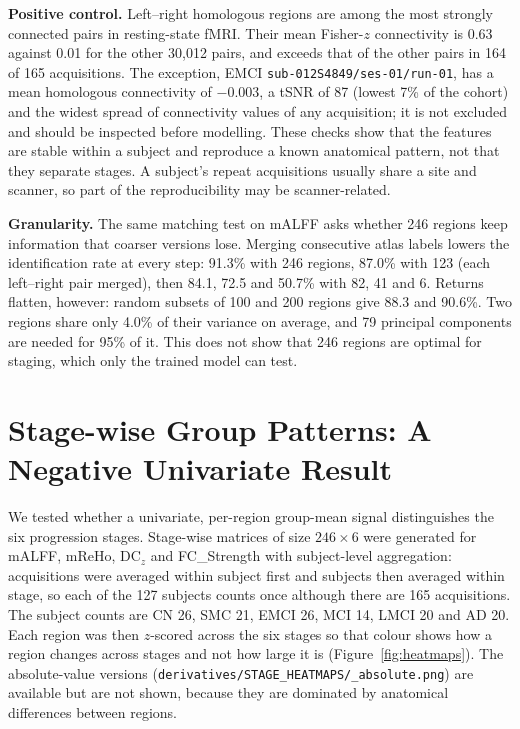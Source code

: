 \documentclass{ssnreview}
\begin{document}
\textbf{Positive control.} Left--right homologous regions are among the most strongly connected
pairs in resting-state fMRI. Their mean Fisher-$z$ connectivity is 0.63 against 0.01 for the other
30{,}012 pairs, and exceeds that of the other pairs in 164 of 165 acquisitions. The exception, EMCI
\texttt{sub-012S4849/\allowbreak ses-01/\allowbreak run-01}, has a mean homologous connectivity of $-0.003$, a
tSNR of 87 (lowest 7\% of the cohort) and the widest spread of connectivity values of any
acquisition; it is not excluded and should be inspected before modelling. These checks show that the
features are stable within a subject and reproduce a known anatomical pattern, not that they separate
stages. A subject's repeat acquisitions usually share a site and scanner, so part of the
reproducibility may be scanner-related.

\textbf{Granularity.} The same matching test on mALFF asks whether 246 regions keep information
that coarser versions lose. Merging consecutive atlas labels lowers the identification rate at every
step: 91.3\% with 246 regions, 87.0\% with 123 (each left--right pair merged), then 84.1, 72.5 and
50.7\% with 82, 41 and 6. Returns flatten, however: random subsets of 100 and 200 regions give 88.3
and 90.6\%. Two regions share only 4.0\% of their variance on average, and 79 principal components
are needed for 95\% of it. This does not show that 246 regions are optimal for staging, which only
the trained model can test.

\section{Stage-wise Group Patterns: A Negative Univariate Result}\label{sec:heatmaps}

We tested whether a univariate, per-region group-mean signal distinguishes the six
progression stages. Stage-wise matrices of size $246\times6$ were generated for
mALFF, mReHo, DC$_z$ and FC\_Strength with subject-level aggregation: acquisitions
were averaged within subject first and subjects then averaged within stage, so each
of the 127 subjects counts once although there are 165 acquisitions. The subject
counts are CN 26, SMC 21, EMCI 26, MCI 14, LMCI 20 and AD 20. Each region was then
$z$-scored across the six stages so that colour shows how a region changes across
stages and not how large it is (Figure~\ref{fig:heatmaps}). The absolute-value
versions (\texttt{derivatives/\allowbreak STAGE\_HEATMAPS/\allowbreak *\_absolute.png}) are available but
are not shown, because they are dominated by anatomical differences between regions.
\end{document}
